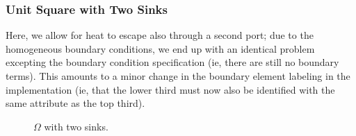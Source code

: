 \subsubsection{Unit Square with Two Sinks}

Here, we allow for heat to escape also through a second port; due to the homogeneous boundary conditions, we end up with
an identical problem excepting the boundary condition specification (ie, there are still no boundary terms). This amounts
to a minor change in the boundary element labeling in the implementation (ie, that the lower third must now also be
identified with the same attribute as the top third).

\begin{figure}[H]
    \centering
    \caption[b]{$\Omega$ with two sinks.}
\end{figure}


\vfill\pagebreak

